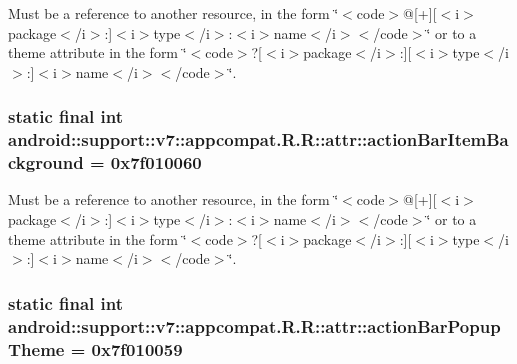 Must be a reference to another resource, in the form \char`\"{}$<$code$>$@\mbox{[}+\mbox{]}\mbox{[}$<$i$>$package$<$/i$>$:\mbox{]}$<$i$>$type$<$/i$>$:$<$i$>$name$<$/i$>$$<$/code$>$\char`\"{} or to a theme attribute in the form \char`\"{}$<$code$>$?\mbox{[}$<$i$>$package$<$/i$>$:\mbox{]}\mbox{[}$<$i$>$type$<$/i$>$:\mbox{]}$<$i$>$name$<$/i$>$$<$/code$>$\char`\"{}. \hypertarget{classandroid_1_1support_1_1v7_1_1appcompat_1_1_r_1_1attr_18dd256ffcbb8cb9cb1e1d4b12f641cd}{
\subsubsection[{actionBarItemBackground}]{\setlength{\rightskip}{0pt plus 5cm}static final int android::support::v7::appcompat.R.R::attr::actionBarItemBackground = 0x7f010060}}
\label{classandroid_1_1support_1_1v7_1_1appcompat_1_1_r_1_1attr_18dd256ffcbb8cb9cb1e1d4b12f641cd}


Must be a reference to another resource, in the form \char`\"{}$<$code$>$@\mbox{[}+\mbox{]}\mbox{[}$<$i$>$package$<$/i$>$:\mbox{]}$<$i$>$type$<$/i$>$:$<$i$>$name$<$/i$>$$<$/code$>$\char`\"{} or to a theme attribute in the form \char`\"{}$<$code$>$?\mbox{[}$<$i$>$package$<$/i$>$:\mbox{]}\mbox{[}$<$i$>$type$<$/i$>$:\mbox{]}$<$i$>$name$<$/i$>$$<$/code$>$\char`\"{}. \hypertarget{classandroid_1_1support_1_1v7_1_1appcompat_1_1_r_1_1attr_ffa44a4704fa606d7877e29c8dbd414b}{
\subsubsection[{actionBarPopupTheme}]{\setlength{\rightskip}{0pt plus 5cm}static final int android::support::v7::appcompat.R.R::attr::actionBarPopupTheme = 0x7f010059}}
\label{classandroid_1_1support_1_1v7_1_1appcompat_1_1_r_1_1attr_ffa44a4704fa606d7877e29c8dbd414b}


